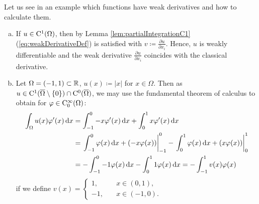 Let us see in an example which functions have weak derivatives and how to calculate them.

\begin{ex} 
\label{ex:weakDerivative}
  \begin{enumerate}[a)]
    \item If $u \in \mathrm{C}^1(\Omega)$, then by Lemma \ref{lem:partialIntegrationC1} (\ref{eq:weakDerivativeDef}) is satisfied with $v \coloneqq \frac{\partial u}{\partial x_i}$.
      Hence, $u$ is weakly differentiable and the weak derivative $\frac{\partial u}{\partial x_i}$ coincides with the classical derivative.
    \item Let $\Omega = (-1,1) \subset \mathbb{R}$, $u(x) \coloneqq |x|$ for $x \in \Omega$.
      Then as $u \in \mathrm{C}^1(\overline \Omega \setminus \{0\}) \cap \mathrm{C}^0(\overline \Omega)$, we may use the fundamental theorem of calculus to obtain for $\varphi \in \mathrm{C}_0^\infty(\Omega)$:
      \begin{align*}
        \int_\Omega u(x) \varphi^\prime(x) \, {\operatorname{d}\!{x}} 
        &= \int_{-1}^0 -x \varphi^\prime(x) \, {\operatorname{d}\!{x}} + \int_0^1 x \varphi^\prime(x) \, {\operatorname{d}\!{x}} \\
        &= \left.\int_{-1}^0 \varphi(x) \, {\operatorname{d}\!{x}} + (-x \varphi(x))\right|_{-1}^0 - \left.\int_0^1 \varphi(x) \, {\operatorname{d}\!{x}} + (x \varphi(x))\right|_0^1 \\
        &= -\int_{-1}^0 -1 \varphi(x) \, {\operatorname{d}\!{x}} - \int_0^1 1 \varphi(x) \, {\operatorname{d}\!{x}}
        = -\int_{-1}^1 v(x) \varphi(x)
      \end{align*}
      if we define $v(x) = \begin{cases} 1, \quad &x \in (0,1), \\ -1, \quad &x \in (-1,0). \end{cases}$


\end{enumerate}
\end{ex}
